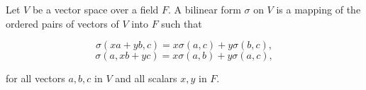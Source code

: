 Let $V$ be a vector space over a field $F$. A bilinear form $\sigma$ on $V$ is a mapping of the ordered pairs of vectors of $V$ into $F$ such that

$$\sigma(xa + yb, c) = x\sigma(a, c) + y\sigma(b, c),$$
$$\sigma(a, xb + yc) = x\sigma(a, b) + y\sigma(a, c),$$

for all vectors $a, b, c$ in $V$ and all scalars $x, y$ in $F$.
